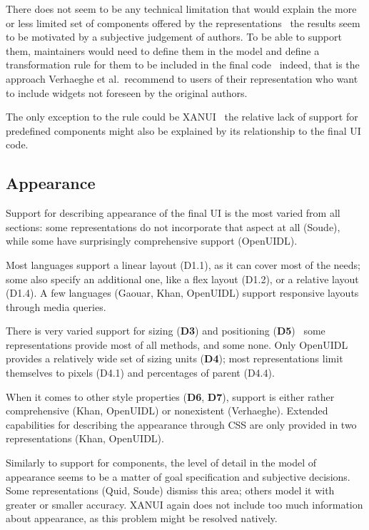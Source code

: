 There does not seem to be any technical limitation that would explain the more or less limited set of components offered by the representations \textendash\ the results seem to be motivated by a subjective judgement of authors.
To be able to support them, maintainers would need to define them in the model and define a transformation rule for them to be included in the final code \textendash\ indeed, that is the approach Verhaeghe et al.\ recommend to users of their representation who want to include widgets not foreseen by the original authors.

The only exception to the rule could be XANUI \textendash\ the relative lack of support for predefined components might also be explained by its relationship to the final UI code.

\subsection{Appearance}\label{subsec:4-2-appearance}
Support for describing appearance of the final UI is the most varied from all sections: some representations do not incorporate that aspect at all (Soude), while some have surprisingly comprehensive support (OpenUIDL).

Most languages support a linear layout (D1.1), as it can cover most of the needs;
some also specify an additional one, like a flex layout (D1.2), or a relative layout (D1.4).
A few languages (Gaouar, Khan, OpenUIDL) support responsive layouts through media queries.

There is very varied support for sizing (\textbf{D3}) and positioning (\textbf{D5}) \textendash\ some representations provide most of all methods, and some none.
Only OpenUIDL provides a relatively wide set of sizing units (\textbf{D4});
most representations limit themselves to pixels (D4.1) and percentages of parent (D4.4).

When it comes to other style properties (\textbf{D6}, \textbf{D7}), support is either rather comprehensive (Khan, OpenUIDL) or nonexistent (Verhaeghe).
Extended capabilities for describing the appearance through CSS are only provided in two representations (Khan, OpenUIDL).

Similarly to support for components, the level of detail in the model of appearance seems to be a matter of goal specification and subjective decisions.
Some representations (Quid, Soude) dismiss this area;
others model it with greater or smaller accuracy.
XANUI again does not include too much information about appearance, as this problem might be resolved natively.

